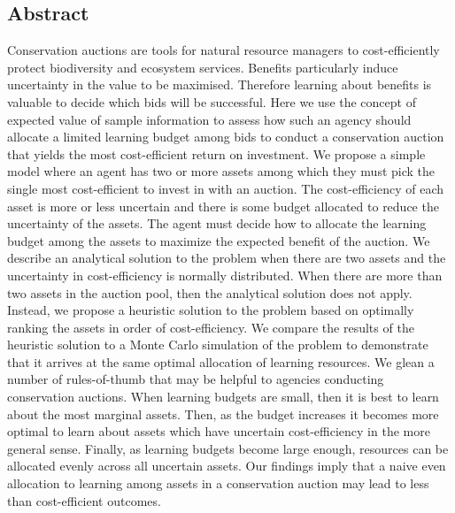 
\subsection*{Abstract}\label{abstract}

Conservation auctions are tools for natural resource managers to cost-efficiently protect biodiversity and ecosystem services. Benefits particularly induce uncertainty in the value to be maximised. Therefore learning about benefits is valuable to decide which bids will be successful. Here we use the concept of expected value of sample information to assess how such an agency should allocate a limited learning budget among bids to conduct a conservation auction that yields the most cost-efficient return on investment. We propose a simple model where an agent has two or more assets among which they must pick the single most cost-efficient to invest in with an auction. The cost-efficiency of each asset is more or less uncertain and there is some budget allocated to reduce the uncertainty of the assets. The agent must decide how to allocate the learning budget among the assets to maximize the expected benefit of the auction. We describe an analytical solution to the problem when there are two assets and the uncertainty in cost-efficiency is normally distributed. When there are more than two assets in the auction pool, then the analytical solution does not apply. Instead, we propose a heuristic solution to the problem based on optimally ranking the assets in order of cost-efficiency. We compare the results of the heuristic solution to a Monte Carlo simulation of the problem to demonstrate that it arrives at the same optimal allocation of learning resources. We glean a number of rules-of-thumb that may be helpful to agencies conducting conservation auctions. When learning budgets are small, then it is best to learn about the most marginal assets. Then, as the budget increases it becomes more optimal to learn about assets which have uncertain cost-efficiency in the more general sense. Finally, as learning budgets become large enough, resources can be allocated evenly across all uncertain assets. Our findings imply that a naive even allocation to learning among assets in a conservation auction may lead to less than cost-efficient outcomes.
